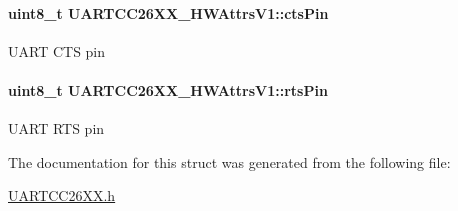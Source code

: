 \paragraph[{cts\+Pin}]{\setlength{\rightskip}{0pt plus 5cm}uint8\+\_\+t U\+A\+R\+T\+C\+C26\+X\+X\+\_\+\+H\+W\+Attrs\+V1\+::cts\+Pin}\label{struct_u_a_r_t_c_c26_x_x___h_w_attrs_v1_a7c613f6fb7ca89f029fc64976af0b9a1}
U\+A\+R\+T C\+T\+S pin 
\paragraph[{rts\+Pin}]{\setlength{\rightskip}{0pt plus 5cm}uint8\+\_\+t U\+A\+R\+T\+C\+C26\+X\+X\+\_\+\+H\+W\+Attrs\+V1\+::rts\+Pin}\label{struct_u_a_r_t_c_c26_x_x___h_w_attrs_v1_ace483e629545c13ad5edf711f566be7e}
U\+A\+R\+T R\+T\+S pin 

The documentation for this struct was generated from the following file\+:\begin{DoxyCompactItemize}
\item 
\hyperlink{_u_a_r_t_c_c26_x_x_8h}{U\+A\+R\+T\+C\+C26\+X\+X.\+h}\end{DoxyCompactItemize}
